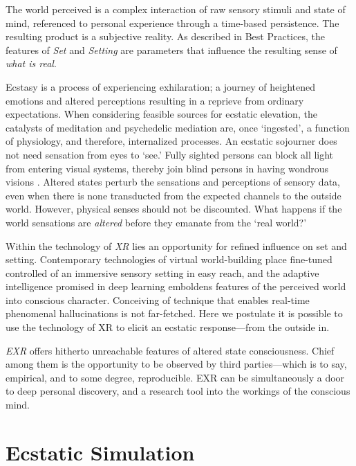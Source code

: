 \documentclass{UIdahoMastersThesis}
\begin{document}
\vspace{9mm}

The world perceived is a complex interaction of raw sensory stimuli and state of mind, referenced to personal experience through a time-based persistence. The resulting product is a subjective reality. As described in Best Practices, the features of \emph{Set} and \emph{Setting} are parameters that influence the resulting sense of \emph{what is real}.

Ecstasy is a process of experiencing exhilaration; a journey of heightened emotions and altered perceptions resulting in a reprieve from ordinary expectations. When considering feasible sources for ecstatic elevation, the catalysts of meditation and psychedelic mediation are, once `ingested', a function of physiology, and therefore, internalized processes. An ecstatic sojourner does not need sensation from eyes to `see.' Fully sighted persons can block all light from entering visual systems, thereby join blind persons in having wondrous visions \cite{sacks_hallucinations_2012}. Altered states perturb the sensations and perceptions of sensory data, even when there is none transducted from the expected channels to the outside world. However, physical senses should not be discounted. What happens if the world sensations are \emph{altered} before	they emanate from the `real world?'

Within the technology of \textit{\ac{XR}} lies an opportunity for refined influence on set and setting. Contemporary technologies of virtual world-building place fine-tuned controlled of an immersive sensory setting in easy reach, and the adaptive intelligence promised in deep learning emboldens features of the perceived world into conscious character. Conceiving of technique that enables real-time phenomenal hallucinations is not far-fetched. Here we postulate it is possible to use the technology of XR to elicit an ecstatic response---from the outside in.
 
\textit{\ac{EXR}} offers hitherto unreachable features of altered state consciousness. Chief among them is the opportunity to be observed by third parties---which is to say, empirical, and to some degree, reproducible. \ac{EXR} can be simultaneously a door to deep personal discovery, and a research tool into the workings of the conscious mind.


\section{Ecstatic Simulation}
\end{document}
